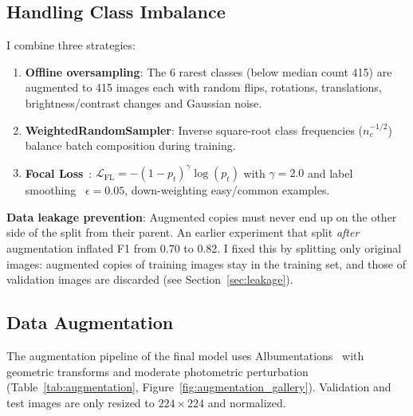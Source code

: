 \documentclass[twocolumn,a4paper]{article}
\begin{document}
\subsection{Handling Class Imbalance}

I combine three strategies:
\begin{enumerate}
    \item \textbf{Offline oversampling}: The 6 rarest classes (below median count 415) are augmented to 415 images each with random flips, rotations, translations, brightness/contrast changes and Gaussian noise.
    \item \textbf{WeightedRandomSampler}: Inverse square-root class frequencies ($n_c^{-1/2}$) balance batch composition during training.
    \item \textbf{Focal Loss}~\cite{lin2017focal}: $\mathcal{L}_{\text{FL}} = -(1 - p_t)^\gamma \log(p_t)$ with $\gamma=2.0$ and label smoothing~\cite{szegedy2016rethinking} $\epsilon=0.05$, down-weighting easy/common examples.
\end{enumerate}

\textbf{Data leakage prevention}: Augmented copies must never end up on the other side of the split from their parent. An earlier experiment that split \textit{after} augmentation inflated F1 from 0.70 to 0.82. I fixed this by splitting only original images: augmented copies of training images stay in the training set, and those of validation images are discarded (see Section~\ref{sec:leakage}).

\subsection{Data Augmentation}

The augmentation pipeline of the final model uses Albumentations~\cite{buslaev2020} with geometric transforms and moderate photometric perturbation (Table~\ref{tab:augmentation}, Figure~\ref{fig:augmentation_gallery}). Validation and test images are only resized to $224\times224$ and normalized.
\end{document}
